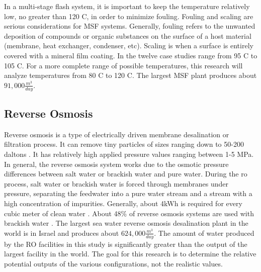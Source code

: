 In a multi-stage flash system, it is important to keep the temperature relatively low, no greater than 120 \degree C, in order to minimize fouling. Fouling and scaling are serious considerations for MSF systems.  Generally, fouling refers to the unwanted deposition of compounds or organic substances on the surface of a host material (membrane, heat exchanger, condenser, etc)\cite{Khayet2016}. Scaling is when a surface is entirely covered with a mineral film coating. In \cite{El-Dessouky2016} the twelve case studies range from 95 \degree C to 105 \degree C. For a more complete range of possible temperatures, this research will analyze temperatures from 80 \degree C to 120 \degree C. The largest MSF plant produces about $91,000\frac{m^3}{day}$.




\subsection{Reverse Osmosis}

Reverse osmosis is a type of electrically driven membrane desalination or filtration process. It can remove tiny particles of sizes ranging down to 50-200 daltons \cite{Pangarkar2011}. It has relatively high applied pressure values ranging between 1-5 MPa. In general, the reverse osmosis system works due to the osmotic pressure differences between salt water or brackish water and pure water. During the \ac{ro} process, salt water or brackish water is forced through membranes under pressure, separating the feedwater into a pure water stream and a stream with a high concentration of impurities.  Generally, about 4kWh is required for every cubic meter of clean water \cite{Pangarkar2011}. About 48\% of reverse osmosis systems are used with brackish water \cite{Pangarkar2011}. The largest sea water reverse osmosis desalination plant in the world is in Israel and produces about $624,000\frac{m^3}{day}$. The amount of water produced by the RO facilities in this study is significantly greater than the output of the largest facility in the world.  The goal for this research is to determine the relative potential outputs of the various configurations, not the realistic values.



